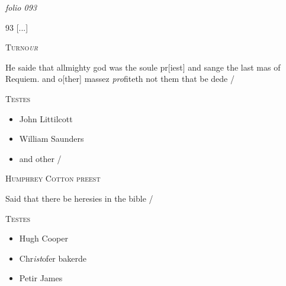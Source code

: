 \documentclass[12pt, a4paper]{book}
\begin{document}
\textit{folio 093}


\begin{flushright}{\color{Mahogany}93} 
				[...]
			\end{flushright}
 

	
				\begin{center} \begin{large} {\scshape Turno\textit{ur}} \end{large} \end{center}
			
	
		
			
		
		\ifthenelse{\isodd{\thepage}}
		{\reversemarginpar}
		{\normalmarginpar}
		He saide that allmighty god was the soule pr[iest]
 and sange the last mas of Requiem. and o[ther]
		massez\textit{ pro}fiteth not them that be dede /
	

	\begin{center} {\scshape Testes} \end{center}\begin{itemize}
		
		\item[]John Littilcott
		\item[]William Saunders
		\item[]and other /
	\end{itemize}
	
		\ifthenelse{\isodd{\thepage}}
		{\reversemarginpar}
		{\normalmarginpar}
		

 

            
            	
				\begin{center} \begin{large} {\scshape Humphrey Cotton preest } \end{large} \end{center}
			
	
		\ifthenelse{\isodd{\thepage}}
		{\reversemarginpar}
		{\normalmarginpar}
		Said that there be heresies in the bible /
 
 	\begin{center} {\scshape Testes} \end{center}\begin{itemize}
 	
 		\item[]Hugh Cooper
 		\item[]Chr\textit{ist}ofer bakerde
 		\item[]Petir James
	\end{itemize}
 	
\end{document}
